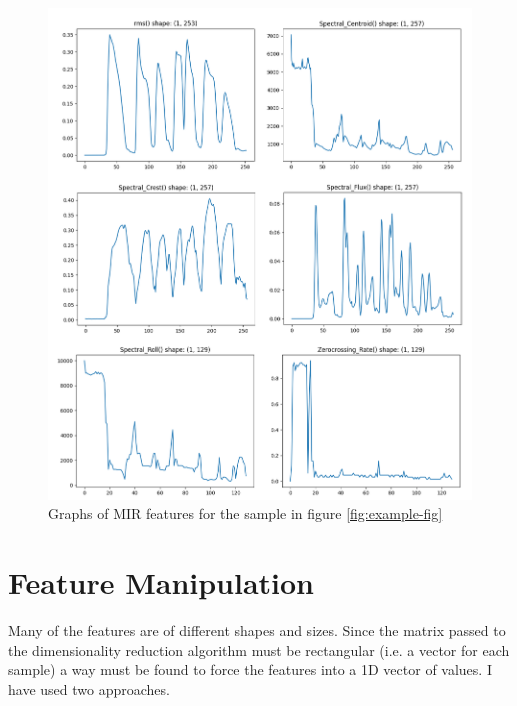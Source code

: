 \documentclass[a4paper, 12pt, twoside]{report}
\begin{document}
\begin{figure}[H]
\centering
\includegraphics[width=.7\linewidth]{./Figures/mir_features.png}
\caption{Graphs of MIR features for the sample in figure \ref{fig:example-fig}}
\end{figure}

\section{Feature Manipulation}
\label{sec:org694b75f}

Many of the features are of different shapes and sizes. Since the matrix passed to the dimensionality reduction algorithm must be rectangular (i.e. a vector for each sample) a way must be found to force the features into a 1D vector of values. I have used two approaches.
\end{document}
